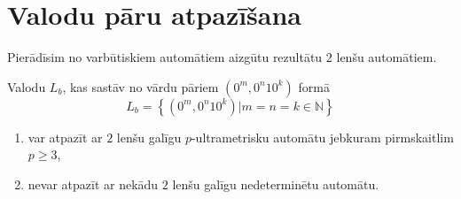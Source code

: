 \documentclass{ludis}
\begin{document}
\section{Valodu pāru atpazīšana}
Pierādīsim no varbūtiskiem automātiem aizgūtu rezultātu $2$ lenšu automātiem.
\begin{teorema}
Valodu $L_b$, kas sastāv no vārdu pāriem $(0^m,0^n10^k)$ formā
\[
	L_b=\left\{(0^m,0^n10^k)|m=n=k \in \mathbb{N} \right\}
\]
\begin{enumerate}[label={(\arabic*)}]
	\item var atpazīt ar $2$ lenšu galīgu $p$-ultrametrisku automātu jebkuram pirmskaitlim $p \geq 3$,
	\item nevar atpazīt ar nekādu $2$ lenšu galīgu nedeterminētu automātu.
\end{enumerate}
\end{teorema}
\end{document}
